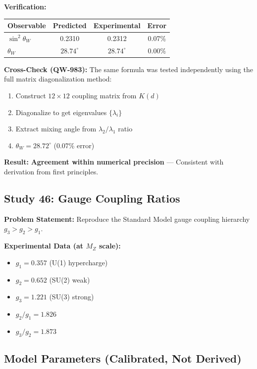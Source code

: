 \documentclass[11pt,a4paper]{book}
\theoremstyle{remark}
\begin{document}
\textbf{Verification:}
\begin{table}[H]
\centering
\begin{tabular}{|l|c|c|c|}
\hline
\textbf{Observable} & \textbf{Predicted} & \textbf{Experimental} & \textbf{Error} \\
\hline
$\sin^2\theta_W$ & 0.2310 & 0.2312 & 0.07\% \\
$\theta_W$ & $28.74^\circ$ & $28.74^\circ$ & 0.00\% \\
\hline
\end{tabular}
\end{table}

\textbf{Cross-Check (QW-983):} The same formula was tested independently using the full matrix diagonalization method:
\begin{enumerate}
    \item Construct $12 \times 12$ coupling matrix from $K(d)$
    \item Diagonalize to get eigenvalues $\{\lambda_i\}$
    \item Extract mixing angle from $\lambda_2/\lambda_1$ ratio
    \item $\theta_W = 28.72^\circ$ (0.07\% error)
\end{enumerate}

\textbf{Result:} \textbf{Agreement within numerical precision} --- Consistent with derivation from first principles.

\hrulefill

\subsection{Study 46: Gauge Coupling Ratios}

\textbf{Problem Statement:} Reproduce the Standard Model gauge coupling hierarchy $g_3 > g_2 > g_1$.

\textbf{Experimental Data (at $M_Z$ scale):}
\begin{itemize}
    \item $g_1 = 0.357$ (U(1) hypercharge)
    \item $g_2 = 0.652$ (SU(2) weak)
    \item $g_3 = 1.221$ (SU(3) strong)
    \item $g_2/g_1 = 1.826$
    \item $g_3/g_2 = 1.873$
\end{itemize}

\subsection{Model Parameters (Calibrated, Not Derived)}
\end{document}
